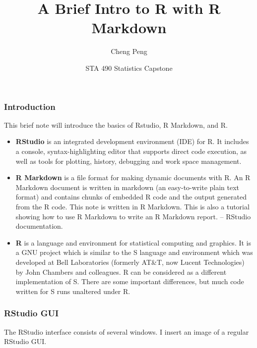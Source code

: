 \documentclass[
]{article}
\title{A Brief Intro to R with R Markdown}
\author{Cheng Peng}
\date{STA 490 Statistics Capstone}
\begin{document}
\maketitle

{
\setcounter{tocdepth}{4}
\tableofcontents
}
\hypertarget{introduction}{%
\subsubsection{Introduction}\label{introduction}}

This brief note will introduce the basics of Rstudio, R Markdown, and R.

\begin{itemize}
\item
  \textbf{RStudio} is an integrated development environment (IDE) for R.
  It includes a console, syntax-highlighting editor that supports direct
  code execution, as well as tools for plotting, history, debugging and
  work space management.
\item
  \textbf{R Markdown} is a file format for making dynamic documents with
  R. An R Markdown document is written in markdown (an easy-to-write
  plain text format) and contains chunks of embedded R code and the
  output generated from the R code. This note is written in R Markdown.
  This is also a tutorial showing how to use R Markdown to write an R
  Markdown report. -- RStudio documentation.
\item
  \textbf{R} is a language and environment for statistical computing and
  graphics. It is a GNU project which is similar to the S language and
  environment which was developed at Bell Laboratories (formerly AT\&T,
  now Lucent Technologies) by John Chambers and colleagues. R can be
  considered as a different implementation of S. There are some
  important differences, but much code written for S runs unaltered
  under R.
\end{itemize}

\hypertarget{rstudio-gui}{%
\subsubsection{RStudio GUI}\label{rstudio-gui}}

The RStudio interface consists of several windows. I insert an image of
a regular RStudio GUI.
\end{document}
